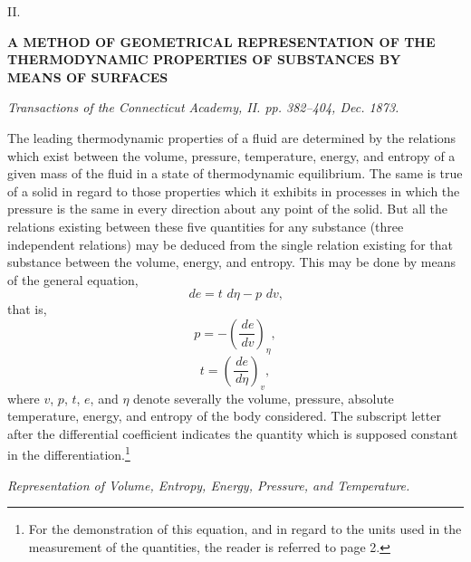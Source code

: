 \documentclass[11pt]{article}
\newcommand{\dd}{\,d}
\begin{document}
\begin{center}
{\large II.}\par\vspace{1.1em}
{\Large\bfseries A METHOD OF GEOMETRICAL REPRESENTATION OF THE\\
THERMODYNAMIC PROPERTIES OF SUBSTANCES BY\\
MEANS OF SURFACES}\par\vspace{0.7em}
{\itshape Transactions of the Connecticut Academy, II. pp. 382--404, Dec. 1873.}
\end{center}

\setcounter{page}{33}

The leading thermodynamic properties of a fluid are determined by the relations which exist between the volume, pressure, temperature, energy, and entropy of a given mass of the fluid in a state of thermodynamic equilibrium. The same is true of a solid in regard to those properties which it exhibits in processes in which the pressure is the same in every direction about any point of the solid. But all the relations existing between these five quantities for any substance (three independent relations) may be deduced from the single relation existing for that substance between the volume, energy, and entropy. This may be done by means of the general equation,
\begin{equation}
\dd e=t\,\dd\eta-p\,\dd v, \tag{1}
\end{equation}
that is,
\begin{equation}
p=-\left(\frac{\dd e}{\dd v}\right)_\eta, \tag{2}
\end{equation}
\begin{equation}
t=\left(\frac{\dd e}{\dd\eta}\right)_v, \tag{3}
\end{equation}
where $v$, $p$, $t$, $e$, and $\eta$ denote severally the volume, pressure, absolute temperature, energy, and entropy of the body considered. The subscript letter after the differential coefficient indicates the quantity which is supposed constant in the differentiation.\footnote{For the demonstration of this equation, and in regard to the units used in the measurement of the quantities, the reader is referred to page 2.}

\begin{center}
\itshape Representation of Volume, Entropy, Energy, Pressure, and Temperature.
\end{center}
\end{document}
